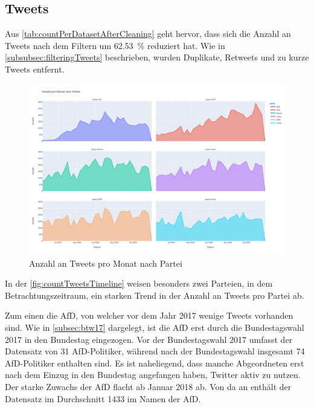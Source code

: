 \subsection*{Tweets}

Aus \autoref{tab:countPerDatasetAfterCleaning} geht hervor, dass sich die Anzahl an Tweets nach dem Filtern um \SI{62.53}{\percent} reduziert hat. Wie in \autoref{subsubsec:filteringTweets} beschrieben, wurden Duplikate, Retweets und zu kurze Tweets entfernt.


\begin{figure}[H]
    \centering
    \includegraphics[width=\textwidth]{data/images/tweets/anzahl_pro_monat_nach_partei.png}
    \caption{Anzahl an Tweets pro Monat nach Partei} \label{fig:countTweetsTimeline}
\end{figure}

In der \autoref{fig:countTweetsTimeline} weisen besonders zwei Parteien, in dem Betrachtungszeitraum, ein starken Trend in der Anzahl an Tweets pro Partei ab.

Zum einen die \ac{AfD}, von welcher vor dem Jahr \num{2017} wenige Tweets vorhanden sind. Wie in \autoref{subsec:btw17} dargelegt, ist die \ac{AfD} erst durch die Bundestagswahl \num{2017} in den Bundestag eingezogen. Vor der Bundestagswahl \num{2017} umfasst der Datensatz von \textcite{saltzer_bundestagswahl_2022} \num{31} \ac{AfD}-Politiker, während nach der Bundestagswahl insgesamt \num{74} \ac{AfD}-Politiker enthalten sind. Es ist naheliegend, dass manche Abgeordneten erst nach dem Einzug in den Bundestag angefangen haben, Twitter aktiv zu nutzen. Der starke Zuwachs der \ac{AfD} flacht ab Januar \num{2018} ab. Von da an enthält der Datensatz im Durchschnitt \num{1433} im Namen der \ac{AfD}.

